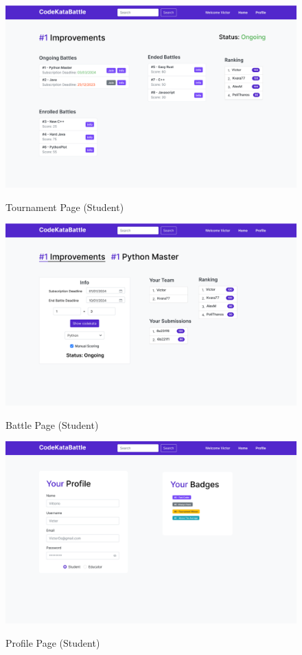 \documentclass{Configuration_Files/Template}
\begin{document}
\begin{figure}[H]
\centering
\includegraphics[scale = 0.25]{Images/UI/TournamentPage_Student.png}\\
\caption{Tournament Page (Student)}
\end{figure}

\begin{figure}[H]
\centering
\includegraphics[scale = 0.25]{Images/UI/BattlePage_Student.png}\\
\caption{Battle Page (Student)}
\end{figure}

\begin{figure}[H]
\centering
\includegraphics[scale = 0.25]{Images/UI/Profile_Student.png}\\
\caption{Profile Page (Student) }
\end{figure}
\end{document}
